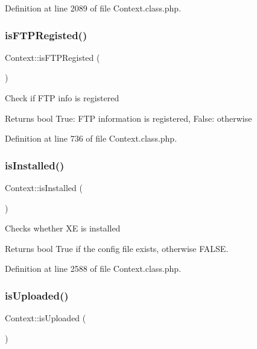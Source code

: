 Definition at line 2089 of file Context.\+class.\+php.

\mbox{\label{classContext_aee42b43176df53b80d5bbf8f6ce14459}} 
\subsubsection{\texorpdfstring{is\+F\+T\+P\+Registed()}{isFTPRegisted()}}
{\footnotesize\ttfamily Context\+::is\+F\+T\+P\+Registed (\begin{DoxyParamCaption}{ }\end{DoxyParamCaption})}

Check if F\+TP info is registered

\begin{DoxyReturn}{Returns}
bool True\+: F\+TP information is registered, False\+: otherwise 
\end{DoxyReturn}


Definition at line 736 of file Context.\+class.\+php.

\mbox{\label{classContext_a5a8714e3a0f9d4722a31ce73017c6613}} 
\subsubsection{\texorpdfstring{is\+Installed()}{isInstalled()}}
{\footnotesize\ttfamily Context\+::is\+Installed (\begin{DoxyParamCaption}{ }\end{DoxyParamCaption})}

Checks whether XE is installed

\begin{DoxyReturn}{Returns}
bool True if the config file exists, otherwise F\+A\+L\+SE. 
\end{DoxyReturn}


Definition at line 2588 of file Context.\+class.\+php.

\mbox{\label{classContext_a65ee4d61d0211c8a3f0eeb4251c85892}} 
\subsubsection{\texorpdfstring{is\+Uploaded()}{isUploaded()}}
{\footnotesize\ttfamily Context\+::is\+Uploaded (\begin{DoxyParamCaption}{ }\end{DoxyParamCaption})}

